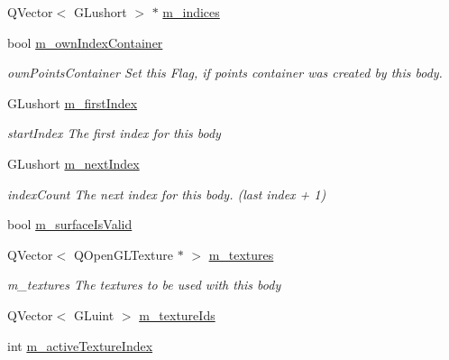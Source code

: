 \begin{DoxyCompactItemize}
Q\+Vector$<$ G\+Lushort $>$ $\ast$ \mbox{\hyperlink{class_g_l_body_a0ac1c7cdd34662989db4204735f05aca}{m\+\_\+indices}}
\item 
\mbox{\label{class_g_l_body_af55a5779ab18630e90686d6e3104b932}} 
bool \mbox{\hyperlink{class_g_l_body_af55a5779ab18630e90686d6e3104b932}{m\+\_\+own\+Index\+Container}}
\begin{DoxyCompactList}\small\item\em own\+Points\+Container Set this Flag, if points container was created by this body. \end{DoxyCompactList}\item 
\mbox{\label{class_g_l_body_a8274ed0febea3f7b3e1a4e2ac8c49314}} 
G\+Lushort \mbox{\hyperlink{class_g_l_body_a8274ed0febea3f7b3e1a4e2ac8c49314}{m\+\_\+first\+Index}}
\begin{DoxyCompactList}\small\item\em start\+Index The first index for this body \end{DoxyCompactList}\item 
\mbox{\label{class_g_l_body_a09c31be4c87449e26ec420916e132eac}} 
G\+Lushort \mbox{\hyperlink{class_g_l_body_a09c31be4c87449e26ec420916e132eac}{m\+\_\+next\+Index}}
\begin{DoxyCompactList}\small\item\em index\+Count The next index for this body. (last index + 1) \end{DoxyCompactList}\item 
bool \mbox{\hyperlink{class_g_l_body_a518355cd5063cb8f7354065f2c521cbc}{m\+\_\+surface\+Is\+Valid}}
\item 
\mbox{\label{class_g_l_body_a741719ede9df7cadd89ff3f86a71eccf}} 
Q\+Vector$<$ Q\+Open\+G\+L\+Texture $\ast$ $>$ \mbox{\hyperlink{class_g_l_body_a741719ede9df7cadd89ff3f86a71eccf}{m\+\_\+textures}}
\begin{DoxyCompactList}\small\item\em m\+\_\+textures The textures to be used with this body \end{DoxyCompactList}\item 
Q\+Vector$<$ G\+Luint $>$ \mbox{\hyperlink{class_g_l_body_a29c73dfe014e2452dd3a2011929aada3}{m\+\_\+texture\+Ids}}
\item 
int \mbox{\hyperlink{class_g_l_body_ad21b09d906e63e5c222ccb96e4d242df}{m\+\_\+active\+Texture\+Index}}

\end{DoxyCompactItemize}
